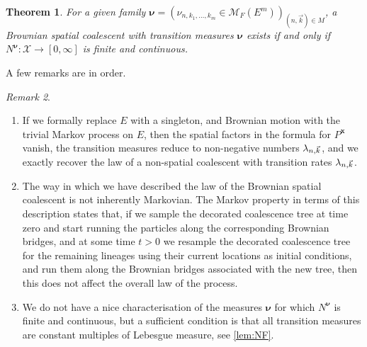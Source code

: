 \documentclass[reqno,draft]{amsart}
\numberwithin{equation}{section}
\theoremstyle{plain}
\newtheorem{theorem}{Theorem}[section]
\theoremstyle{remark}
\newtheorem{remark}[theorem]{Remark}
\newcommand{\mergers}{M}
\newcommand{\lank}{\lambda_{n,\smash{\vec{k}}}}
\begin{document}
\begin{theorem}\label{thm:BSCintro2}
    For a given family $\boldsymbol \nu = (\nu_{n,k_1, \ldots ,k_m} \in \mathcal{M}_F(E^m))_{(n,\vec{k})\in \mergers}$, a Brownian spatial coalescent with transition measures $\boldsymbol \nu$ exists if and only if $N^{\boldsymbol \nu}\colon \mathcal{X} \to [0,\infty]$ is finite and continuous.
\end{theorem}

A few remarks are in order.

\begin{remark}\label{rem:nunk}
    \begin{enumerate}
        \item If we formally replace $E$ with a singleton, and Brownian motion with the trivial Markov process on $E$, then the spatial factors in the formula for $P^{\boldsymbol x}$ vanish, the transition measures reduce to non-negative numbers $\lank$, and we exactly recover the law of a non-spatial coalescent with transition rates $\lank$.
        \item The way in which we have described the law of the Brownian spatial coalescent is not inherently Markovian. The Markov property in terms of this description states that, if we sample the decorated coalescence tree at time zero and start running the particles along the corresponding Brownian bridges, and at some time $t > 0$ we resample the decorated coalescence tree for the remaining lineages using their current locations as initial conditions, and run them along the Brownian bridges associated with the new tree, then this does not affect the overall law of the process.
        \item %
We do not have a nice characterisation of the measures $\boldsymbol \nu$ for which $N^{\boldsymbol \nu}$ is finite and continuous, but a sufficient condition is that all transition measures are constant multiples of Lebesgue measure, see \cref{lem:NF}. %

\end{enumerate}
\end{remark}
\end{document}
